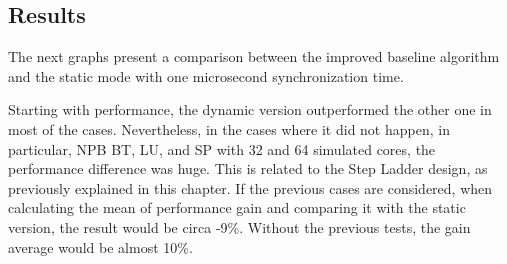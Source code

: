 \subsection{Results}

The next graphs present a comparison between the improved baseline algorithm and the static mode with one microsecond synchronization time. 

Starting with performance, the dynamic version outperformed the other one in most of the cases. Nevertheless, in the cases where it 
did not happen, in particular, NPB BT, LU, and SP with 32 and 64 simulated cores, the performance difference was huge. 
This is related to the Step Ladder design, as previously explained in this chapter. 
If the previous cases are considered,
when calculating the mean of performance gain and comparing it with the static version, the result would be circa -9\%. Without the previous 
tests, the gain average would be almost 10\%. 

